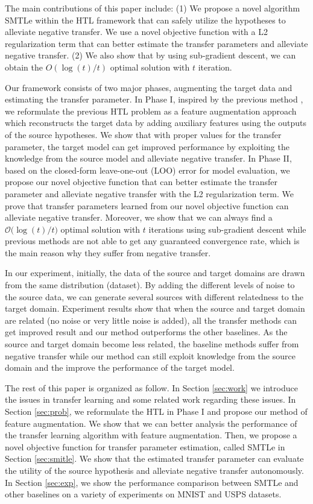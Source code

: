 The main contributions of this paper include: (1) We propose a novel algorithm SMTLe within the HTL framework that can safely utilize the hypotheses to alleviate negative transfer. We use a novel objective function with a L2 regularization term that can better estimate the transfer parameters and alleviate negative transfer. (2) We also show that by using sub-gradient descent, we can obtain the $O({\log(t)}/{t})$ optimal solution with $t$ iteration.

Our framework consists of two major phases, augmenting the target data and estimating the transfer parameter. In Phase I, inspired by the previous method \cite{vapnik2015learning}, we reformulate the previous HTL problem as a feature augmentation approach which reconstructs the target data by adding auxiliary features using the outputs of the source hypotheses. We show that with proper values for the transfer parameter, the target model can get improved performance by exploiting the knowledge from the source model and alleviate negative transfer.
In Phase II, 
based on the closed-form leave-one-out (LOO) error for model evaluation, we propose our novel objective function that can better estimate the transfer parameter and alleviate negative transfer with the L2 regularization term. We prove that transfer parameters learned from our novel objective function can alleviate negative transfer. Moreover, we show that we can always find a $\mathcal{O}{(\log(t)}/{t})$ optimal solution with $t$ iterations using sub-gradient descent while previous methods are not able to get any guaranteed convergence rate, which is the main reason why they suffer from negative transfer.

In our experiment, initially, the data of the source and target domains are drawn from the same distribution (dataset). By adding the different levels of noise to the source data, we can generate several sources with different relatedness to the target domain. Experiment results show that when the source and target domain are related (no noise or very little noise is added), all the transfer methods can get improved result and our method outperforms the other baselines. As the source and target domain become less related, the baseline methods suffer from negative transfer while our method can still exploit knowledge from the source domain and the improve the performance of the target model. 

The rest of this paper is organized as follow. In Section \ref{sec:work} we introduce the issues in transfer learning and some related work regarding these issues.
In Section \ref{sec:prob}, we reformulate the HTL in Phase I and propose our method of feature augmentation. We show that we can better analysis the performance of the transfer learning algorithm with feature augmentation. Then, we propose a novel objective function for transfer parameter estimation, called SMTLe in Section \ref{sec:smitle}. We show that the estimated transfer parameter can evaluate the utility of the source hypothesis and alleviate negative transfer autonomously. In Section \ref{sec:exp}, we show the performance comparison between SMTLe and other baselines on a variety of experiments on MNIST and USPS datasets.
